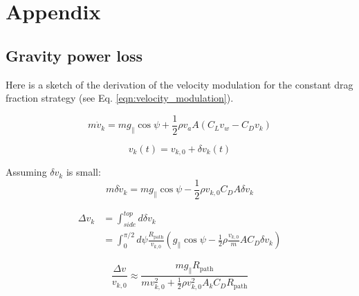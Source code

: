 \documentclass[11pt]{amsart}
\newcommand{\app}{a}
\newcommand{\kite}{k}
\newcommand{\path}{\mathrm{path}}
\newcommand{\wind}{w}
\begin{document}



\section{Appendix}

\subsection{Gravity power loss}

Here is a sketch of the derivation of the velocity modulation for the
constant drag fraction strategy (see Eq. \ref{eqn:velocity_modulation}).

\begin{equation}
  m \dot v_{\kite} = m g_{\parallel} \cos \psi +
                     \frac{1}{2} \rho v_{\app} A (C_L v_{\wind} - C_D v_{\kite})
\end{equation}

\begin{equation}
  v_{\kite}(t) = v_{\kite, 0} + \delta v_{\kite}(t)
\end{equation}

Assuming $\delta v_{\kite}$ is small:
%
\begin{equation}
  m \delta \dot v_{\kite} = m g_{\parallel} \cos \psi -
                            \frac{1}{2} \rho v_{\kite, 0} C_D A \delta v_{\kite}
\end{equation}

\begin{align}
  \Delta v_{\kite} &= \int_{side}^{top} d \delta v_{\kite} \\
                   &= \int_0^{\pi/2} d\psi \frac{R_{\path}}{v_{\kite, 0}}
                      \left(g_{\parallel} \cos \psi -
                      \frac{1}{2} \rho \frac{v_{\kite, 0}}{m} A C_D \delta v_{\kite} \right)
\end{align}

\begin{equation}
  \frac{\Delta v}{v_{\kite,0}} \approx
  \frac{m g_{\parallel} R_{\path}}
       {m v_{\kite, 0}^2 +
        \frac{1}{2} \rho v_{\kite, 0}^2 A_{\kite} C_D R_{\path}}
\end{equation}
\end{document}
